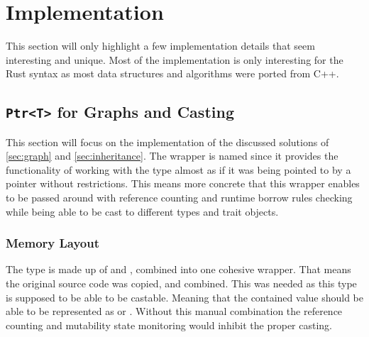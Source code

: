 \documentclass[thesis]{subfiles}
\begin{document}
\chapter{Implementation}
This section will only highlight a few implementation details that seem interesting and unique.
Most of the implementation is only interesting for the Rust syntax as most data structures and algorithms were ported from C++.

\section{\texttt{Ptr<T>} for Graphs and Casting}\label{sec:ptr}
  This section will focus on the implementation of the discussed solutions of \autoref{sec:graph} and \autoref{sec:inheritance}.
  The wrapper is named \PtrT since it provides the functionality of working with the type \T almost as if it was being pointed to by a pointer without restrictions.
  This means more concrete that this wrapper enables \T to be passed around with reference counting and runtime borrow rules checking while being able to be cast to different types and trait objects.

  \subsection{Memory Layout}
    The type is made up of \RcT and \RefCellT, combined into one cohesive wrapper.
    That means the original source code was copied, and combined.
    This was needed as this type is supposed to be able to be castable.
    Meaning that the contained value should be able to be represented as \struct or \trait.
    Without this manual combination the reference counting and mutability state monitoring would inhibit the proper casting.

    \newsavebox{\ptrStruct}
    \begin{lrbox}{\ptrStruct}
      \begin{minipage}{.45\linewidth}
        
      \end{minipage}
    \end{lrbox}

    \newsavebox{\rcRefCellStruct}
    \begin{lrbox}{\rcRefCellStruct}
      \begin{minipage}{.45\linewidth}
        
      \end{minipage}
    \end{lrbox}
\end{document}
